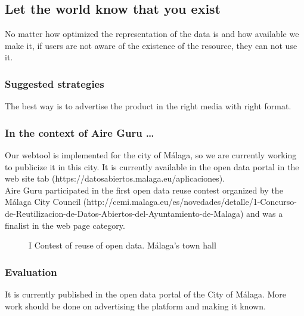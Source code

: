 \subsection{Let the world know that you exist}

No matter how optimized the representation of the data is and how available we make it, if users are not aware
of the existence of the resource, they can not use it.

\subsubsection*{Suggested strategies} 

The best way is to advertise the product in the right media with right format.

\subsubsection*{In the context of Aire Guru \ldots}

Our webtool is implemented for the city of Málaga, so we are currently working to publicize it in this city.
It is currently available in the open data portal in the web site tab (https://datosabiertos.malaga.eu/aplicaciones). \\

Aire Guru participated in the first open data reuse contest organized by the Málaga City Council (http://cemi.malaga.eu/es/novedades/detalle/1-Concurso-de-Reutilizacion-de-Datos-Abiertos-del-Ayuntamiento-de-Malaga)
and was a finalist in the web page category.

\begin{figure}[ht]
    \centering
   \hfill
 
    \caption{I Contest of reuse of open data. Málaga's town hall}
    \end{figure}

\subsubsection*{Evaluation}  

\begin{itemize}
    \done It is currently published in the open data portal of the City of Málaga.
    \crossed More work should be done on advertising the platform and making it known.
\end{itemize}